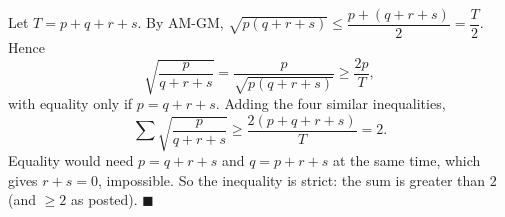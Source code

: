 Let $T=p+q+r+s$. By AM-GM, $\sqrt{p(q+r+s)}\le\dfrac{p+(q+r+s)}{2}=\dfrac {T}{2}$. Hence
\[
\sqrt{\dfrac{p}{q+r+s}}=\dfrac{p}{\sqrt{p(q+r+s)}}\ge\dfrac{2p}{T},
\]
with equality only if $p=q+r+s$. Adding the four similar inequalities,
\[
\sum\sqrt{\dfrac{p}{q+r+s}}\ge\dfrac{2(p+q+r+s)}{T}=2 .
\]
Equality would need $p=q+r+s$ and $q=p+r+s$ at the same time, which gives $r+s=0$, impossible. So the inequality is strict: the sum is greater than $2$ (and $\ge2$ as posted). $\blacksquare$
